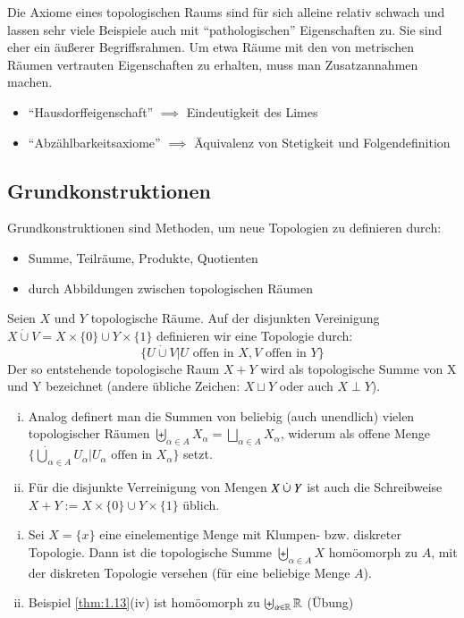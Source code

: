 \documentclass[a4paper,10pt]{scrartcl}
\begin{document}
\begin{note}
Die Axiome eines topologischen Raums sind für sich alleine relativ schwach und lassen sehr viele Beispiele auch mit "`pathologischen"' Eigenschaften zu. Sie sind eher ein äußerer Begriffsrahmen. Um etwa Räume mit den von metrischen Räumen vertrauten Eigenschaften zu erhalten, muss man Zusatzannahmen machen.
\begin{itemize}
  \item "`Hausdorffeigenschaft"' $\implies$ Eindeutigkeit des Limes
  \item "`Abzählbarkeitsaxiome"' $\implies$ Äquivalenz von Stetigkeit und Folgendefinition
\end{itemize}
\end{note}
\subsection{Grundkonstruktionen}
Grundkonstruktionen sind Methoden, um neue Topologien zu definieren durch:
\begin{itemize}
\item Summe, Teilräume, Produkte, Quotienten
\item durch Abbildungen zwischen topologischen Räumen
\end{itemize}
\begin{df}
Seien $ X $ und $ Y $ topologische Räume. Auf der disjunkten Vereinigung $ X \mathbin{\dot{\cup}} V =X \times \{ 0 \} \cup Y \times \{1\}$ definieren wir eine Topologie durch:
\[
\{U \mathbin{\dot{\cup}} V| U \text{ offen in } X, V \text{ offen in } Y\}
\]
Der so entstehende topologische Raum $ X+Y $ wird als topologische Summe von X und Y bezeichnet (andere übliche Zeichen: $X \sqcup Y$ oder auch $X \perp Y$).
\end{df}
\begin{note*}
\begin{enumerate}[(i)]
\item Analog definert man die Summen von beliebig (auch unendlich) vielen topologischer Räumen $\biguplus_{\alpha \in  A} X_\alpha=\bigsqcup_{\alpha\in A} X_\alpha$, widerum als offene Menge $\{\dot \bigcup_{\alpha\in A} U_\alpha | U_\alpha \text{ offen in } X_\alpha \}$ setzt.
\item Für die disjunkte Verreinigung von Mengen $ X \mathbin{\dot{\cup}} Y $ ist auch die Schreibweise $X+Y:= X\times\{0\} \cup Y\times \{1\}$ üblich.  
\end{enumerate}
\end{note*}
\begin{ex*}
\begin{enumerate}[(i)]
\item Sei $ X=\{ x\} $ eine einelementige Menge mit Klumpen- bzw. diskreter Topologie. Dann ist die topologische Summe $ \biguplus_{\alpha\in A}X $ homöomorph zu $A$, mit der diskreten Topologie versehen (für eine beliebige Menge $A$). 
\item Beispiel \ref{thm:1.13}(iv) ist homöomorph zu $ \biguplus_{\alpha\in \mathbb{R}}  \mathbb{R} $ (Übung)
\end{enumerate}
\end{ex*}
\end{document}
